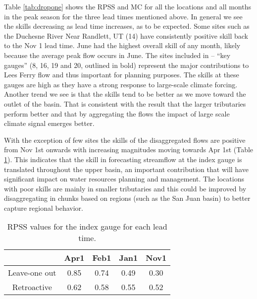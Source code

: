 \documentclass[final,5p,times,twocolumn,authoryear]{elsarticle}
\begin{document}
Table \ref{tab:dropone} shows the RPSS and MC for all the locations and all months in the peak season for the three lead times mentioned above. In general we see the skills decreasing as lead time increases, as to be expected. Some sites such as the Duchesne River Near Randlett, UT (14) have consistently positive skill back to the Nov 1 lead time. June had the highest overall skill of any month, likely because the average peak flow occurs in June. The sites included in \cite{Bracken:2010cw} -- ``key gauges'' (8, 16, 19 and 20, outlined in bold) represent the major contributions to Lees Ferry flow and thus important for planning purposes.  The skills at these gauges are high as they have a strong response to large-scale climate forcing.  Another trend we see is that the skills tend to be better as we move toward the outlet of the basin. That is consistent with the result that the larger tributaries perform better and that by aggregating the flows the impact of large scale climate signal emerges better. 

With the exception of few sites the skills of the disaggregated flows are positive from Nov 1st onwards with increasing magnitudes moving towards Apr 1st (Table \ref{tab:indexskill}). This indicates that the skill in forecasting streamflow at the index gauge is translated throughout the upper basin, an important contribution that will have significant impact on water resources planning and management. The locations with poor skills are mainly in smaller tributaries and this could be improved by disaggregating  in chunks based on regions (such as the San Juan basin) to better capture regional behavior. 
 
\begin{table}[ht]
\centering 
\caption{RPSS values for the index gauge for each lead time.}\label{tab:indexskill}
\begin{tabular}{ccccc}  
\toprule
& Apr1 & Feb1 & Jan1 & Nov1 \\
\midrule
Leave-one out & 0.85 & 0.74 & 0.49 & 0.30 \\
Retroactive   & 0.62 & 0.58 & 0.55 & 0.52 \\
\bottomrule
\end{tabular}
\end{table}

\end{document}
